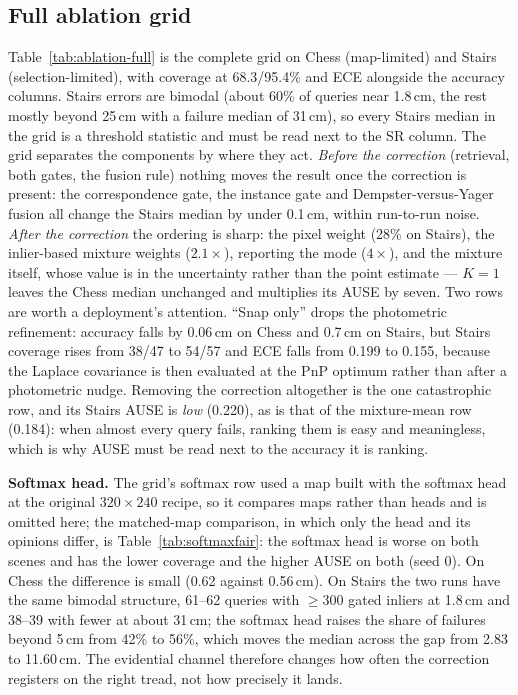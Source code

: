 \documentclass[journal]{IEEEtran}
\begin{document}
\subsection{Full ablation grid}
\label{sec:ablation-full}
Table~\ref{tab:ablation-full} is the complete grid on Chess (map-limited) and
Stairs (selection-limited), with coverage at 68.3/95.4\% and ECE alongside the accuracy columns. Stairs errors are bimodal (about 60\% of queries near 1.8\,cm, the rest mostly beyond 25\,cm with a failure median of 31\,cm), so every Stairs median in the grid is a threshold statistic and must be read next to the SR column. The grid separates the components by where they act.
\emph{Before the correction} (retrieval, both gates, the fusion rule) nothing
moves the result once the correction is present: the correspondence gate,
the instance gate and Dempster-versus-Yager fusion all change the Stairs
median by under 0.1\,cm, within run-to-run noise. \emph{After the
correction} the ordering is sharp: the pixel weight (28\% on Stairs), the
inlier-based mixture weights ($2.1\times$), reporting the mode ($4\times$),
and the mixture itself, whose value is in the uncertainty rather than the
point estimate --- $K{=}1$ leaves the Chess median unchanged and multiplies
its AUSE by seven. Two rows are worth a deployment's attention. ``Snap
only'' drops the photometric refinement: accuracy falls by 0.06\,cm on Chess
and 0.7\,cm on Stairs, but Stairs coverage rises from 38/47 to 54/57 and ECE falls from 0.199 to 0.155, because the Laplace covariance is then evaluated at the
PnP optimum rather than after a photometric nudge. Removing the correction
altogether is the one catastrophic row, and its Stairs AUSE is \emph{low} (0.220), as is that of the mixture-mean row (0.184): when almost every query fails, ranking
them is easy and meaningless, which is why AUSE must be read next to the
accuracy it is ranking.

\textbf{Softmax head.} The grid's softmax row used a map built with the
softmax head at the original $320{\times}240$ recipe, so it compares maps
rather than heads and is omitted here; the matched-map comparison, in which only the head and its opinions differ, is Table~\ref{tab:softmaxfair}: the softmax head is worse on both scenes and has the lower coverage and the higher AUSE on both (seed 0). On Chess the difference is small (0.62 against 0.56\,cm). On Stairs the two runs have the same bimodal structure, 61--62 queries with $\ge$300 gated inliers at 1.8\,cm and 38--39 with fewer at about 31\,cm; the softmax head raises the share of failures beyond 5\,cm from 42\% to 56\%, which moves the median across the gap from 2.83 to 11.60\,cm. The evidential channel therefore changes how often the correction registers on the right tread, not how precisely it lands. 
\end{document}

